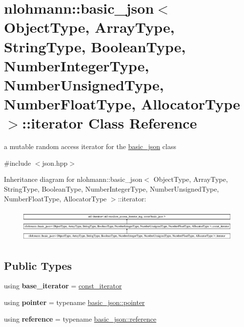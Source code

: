 \hypertarget{classnlohmann_1_1basic__json_1_1iterator}{}\section{nlohmann\+:\+:basic\+\_\+json$<$ Object\+Type, Array\+Type, String\+Type, Boolean\+Type, Number\+Integer\+Type, Number\+Unsigned\+Type, Number\+Float\+Type, Allocator\+Type $>$\+:\+:iterator Class Reference}
\label{classnlohmann_1_1basic__json_1_1iterator}


a mutable random access iterator for the \hyperlink{classnlohmann_1_1basic__json}{basic\+\_\+json} class  




{\ttfamily \#include $<$json.\+hpp$>$}

Inheritance diagram for nlohmann\+:\+:basic\+\_\+json$<$ Object\+Type, Array\+Type, String\+Type, Boolean\+Type, Number\+Integer\+Type, Number\+Unsigned\+Type, Number\+Float\+Type, Allocator\+Type $>$\+:\+:iterator\+:\begin{figure}[H]
\begin{center}
\leavevmode
\includegraphics[height=1.705584cm]{classnlohmann_1_1basic__json_1_1iterator}
\end{center}
\end{figure}
\subsection*{Public Types}
\begin{DoxyCompactItemize}
\item 
\hypertarget{classnlohmann_1_1basic__json_1_1iterator_ac48754e4dc48d65d95294bd170dcd857}{}\label{classnlohmann_1_1basic__json_1_1iterator_ac48754e4dc48d65d95294bd170dcd857} 
using {\bfseries base\+\_\+iterator} = \hyperlink{classnlohmann_1_1basic__json_1_1const__iterator}{const\+\_\+iterator}
\item 
\hypertarget{classnlohmann_1_1basic__json_1_1iterator_a3aae1df93a78b201d98e178c1c7d02a7}{}\label{classnlohmann_1_1basic__json_1_1iterator_a3aae1df93a78b201d98e178c1c7d02a7} 
using {\bfseries pointer} = typename \hyperlink{classnlohmann_1_1basic__json_a9d1b58099dc64695fcf2847ab0b2a7c7}{basic\+\_\+json\+::pointer}
\item 
\hypertarget{classnlohmann_1_1basic__json_1_1iterator_a97aff5d71246774267a81066460dd1cf}{}\label{classnlohmann_1_1basic__json_1_1iterator_a97aff5d71246774267a81066460dd1cf} 
using {\bfseries reference} = typename \hyperlink{classnlohmann_1_1basic__json_a3ec8e17be8732fe436e9d6733f52b7a3}{basic\+\_\+json\+::reference}
\end{DoxyCompactItemize}
